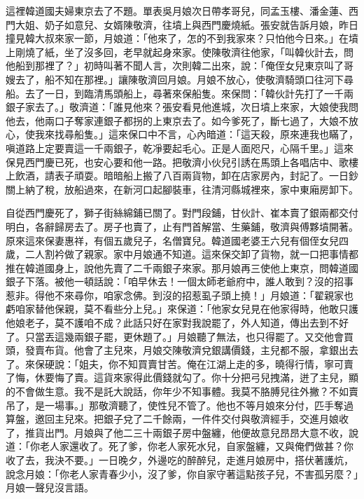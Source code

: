 這裡韓道國夫婦東京去了不題。單表吳月娘次日帶孝哥兒，同孟玉樓、潘金蓮、西門大姐、奶子如意兒、女婿陳敬濟，往墳上與西門慶燒紙。張安就告訴月娘，昨日撞見韓大叔來家一節，月娘道：「他來了，怎的不到我家來？只怕他今日來。」在墳上剛燒了紙，坐了沒多回，老早就起身來家。使陳敬濟往他家，「叫韓伙計去，問他船到那裡了？」初時叫著不聞人言，次則韓二出來，說：「俺侄女兒東京叫了哥嫂去了，船不知在那裡。」讓陳敬濟回月娘。月娘不放心，使敬濟騎頭口往河下尋船。去了一日，到臨清馬頭船上，尋著來保船隻。來保問：「韓伙計先打了一千兩銀子家去了。」敬濟道：「誰見他來？張安看見他進城，次日墳上來家，大娘使我問他去，他兩口子奪家連銀子都拐的上東京去了。如今爹死了，斷七過了，大娘不放心，使我來找尋船隻。」這來保口中不言，心內暗道：「這天殺，原來連我也瞞了，嗔道路上定要賣這一千兩銀子，乾凈要起毛心。正是人面咫尺，心隔千里。」這來保見西門慶已死，也安心要和他一路。把敬濟小伙兒引誘在馬頭上各唱店中、歌樓上飲酒，請表子頑耍。暗暗船上搬了八百兩貨物，卸在店家房內，封記了。一日鈔關上納了稅，放船過來，在新河口起腳裝車，往清河縣城裡來，家中東廂房卸下。

自從西門慶死了，獅子街絲綿鋪已關了。對門段鋪，甘伙計、崔本賣了銀兩都交付明白，各辭歸房去了。房子也賣了，止有門首解當、生藥鋪，敬濟與傅夥墳開著。原來這來保妻惠祥，有個五歲兒子，名僧寶兒。韓道國老婆王六兒有個侄女兒四歲，二人割衿做了親家。家中月娘通不知道。這來保交卸了貨物，就一口把事情都推在韓道國身上，說他先賣了二千兩銀子來家。那月娘再三使他上東京，問韓道國銀子下落。被他一頓話說：「咱早休去！一個太師老爺府中，誰人敢到？沒的招事惹非。得他不來尋你，咱家念佛。到沒的招惹虱子頭上撓！」月娘道：「翟親家也虧咱家替他保親，莫不看些分上兒。」來保道：「他家女兒見在他家得時，他敢只護他娘老子，莫不護咱不成？此話只好在家對我說罷了，外人知道，傳出去到不好了。只當丟這幾兩銀子罷，更休題了。」月娘聽了無法，也只得罷了。又交他會買頭，發賣布貨。他會了主兒來，月娘交陳敬濟兌銀講價錢，主兒都不服，拿銀出去了。來保硬說：「姐夫，你不知買賣甘苦。俺在江湖上走的多，曉得行情，寧可賣了悔，休要悔了賣。這貨來家得此價錢就勾了。你十分把弓兒拽滿，迸了主兒，顯的不會做生意。我不是託大說話，你年少不知事體。我莫不胳膊兒往外撇？不如賣吊了，是一場事。」那敬濟聽了，使性兒不管了。他也不等月娘來分付，匹手奪過算盤，邀回主兒來。把銀子兌了二千餘兩，一件件交付與敬濟經手，交進月娘收了，推貨出門。月娘與了他二三十兩銀子房中盤纏，他便故意兒昂昂大意不收，說道：「你老人家還收了。死了爹，你老人家死水兒，自家盤纏，又與俺們做甚？你收了去，我決不要。」一日晚夕，外邊吃的醉醉兒，走進月娘房中，搭伏著護炕，說念月娘：「你老人家青春少小，沒了爹，你自家守著這點孩子兒，不害孤另麼？」月娘一聲兒沒言語。

